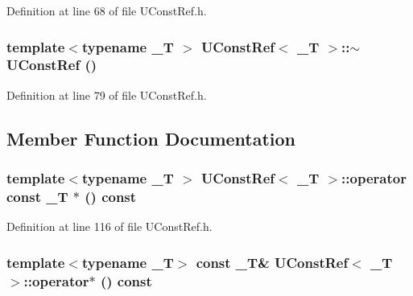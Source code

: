 Definition at line 68 of file UConstRef.h.\hypertarget{class_u_const_ref_55fd512d23ddc51a39dbedbe9c5b5153}{
\subsubsection[{$\sim$UConstRef}]{\setlength{\rightskip}{0pt plus 5cm}template$<$typename \_\-T $>$ {\bf UConstRef}$<$ \_\-T $>$::$\sim${\bf UConstRef} ()}}
\label{class_u_const_ref_55fd512d23ddc51a39dbedbe9c5b5153}




Definition at line 79 of file UConstRef.h.

\subsection{Member Function Documentation}
\hypertarget{class_u_const_ref_5231901f5b5f4f9b5e626ec9277e57db}{
\subsubsection[{operator const \_\-T $\ast$}]{\setlength{\rightskip}{0pt plus 5cm}template$<$typename \_\-T $>$ {\bf UConstRef}$<$ \_\-T $>$::operator const \_\-T $\ast$ () const}}
\label{class_u_const_ref_5231901f5b5f4f9b5e626ec9277e57db}




Definition at line 116 of file UConstRef.h.\hypertarget{class_u_const_ref_9e338a1ebe7c20b4b30a60e4fcb7c134}{
\subsubsection[{operator$\ast$}]{\setlength{\rightskip}{0pt plus 5cm}template$<$typename \_\-T$>$ const \_\-T\& {\bf UConstRef}$<$ \_\-T $>$::operator$\ast$ () const}}
\label{class_u_const_ref_9e338a1ebe7c20b4b30a60e4fcb7c134}




